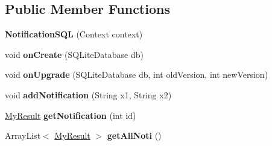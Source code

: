 \subsection*{Public Member Functions}
\begin{DoxyCompactItemize}
\item 
\hypertarget{classantardhvani_1_1du_1_1ac_1_1in_1_1_database_1_1_notification_s_q_l_ac26ac09fd1ce90bb414bf718d477c6f7}{}{\bfseries Notification\+S\+Q\+L} (Context context)\label{classantardhvani_1_1du_1_1ac_1_1in_1_1_database_1_1_notification_s_q_l_ac26ac09fd1ce90bb414bf718d477c6f7}

\item 
\hypertarget{classantardhvani_1_1du_1_1ac_1_1in_1_1_database_1_1_notification_s_q_l_a9fc4e9314f9b58ae0729ccf9819bbd8e}{}void {\bfseries on\+Create} (S\+Q\+Lite\+Database db)\label{classantardhvani_1_1du_1_1ac_1_1in_1_1_database_1_1_notification_s_q_l_a9fc4e9314f9b58ae0729ccf9819bbd8e}

\item 
\hypertarget{classantardhvani_1_1du_1_1ac_1_1in_1_1_database_1_1_notification_s_q_l_a8524f412a1e0dd0508fc0e0b4811a48a}{}void {\bfseries on\+Upgrade} (S\+Q\+Lite\+Database db, int old\+Version, int new\+Version)\label{classantardhvani_1_1du_1_1ac_1_1in_1_1_database_1_1_notification_s_q_l_a8524f412a1e0dd0508fc0e0b4811a48a}

\item 
\hypertarget{classantardhvani_1_1du_1_1ac_1_1in_1_1_database_1_1_notification_s_q_l_a11980d22cfc29f6101875d031d2bd805}{}void {\bfseries add\+Notification} (String x1, String x2)\label{classantardhvani_1_1du_1_1ac_1_1in_1_1_database_1_1_notification_s_q_l_a11980d22cfc29f6101875d031d2bd805}

\item 
\hypertarget{classantardhvani_1_1du_1_1ac_1_1in_1_1_database_1_1_notification_s_q_l_ad8d5c544a13de28d9c164343922930d2}{}\hyperlink{classantardhvani_1_1du_1_1ac_1_1in_1_1_database_1_1_my_result}{My\+Result} {\bfseries get\+Notification} (int id)\label{classantardhvani_1_1du_1_1ac_1_1in_1_1_database_1_1_notification_s_q_l_ad8d5c544a13de28d9c164343922930d2}

\item 
\hypertarget{classantardhvani_1_1du_1_1ac_1_1in_1_1_database_1_1_notification_s_q_l_addcbc1af9f4c45cb75a8bcf43d5fa046}{}Array\+List$<$ \hyperlink{classantardhvani_1_1du_1_1ac_1_1in_1_1_database_1_1_my_result}{My\+Result} $>$ {\bfseries get\+All\+Noti} ()\label{classantardhvani_1_1du_1_1ac_1_1in_1_1_database_1_1_notification_s_q_l_addcbc1af9f4c45cb75a8bcf43d5fa046}


\end{DoxyCompactItemize}
